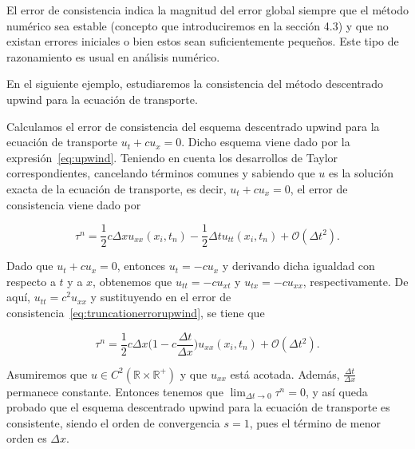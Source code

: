\begin{remark}
  El error de consistencia indica la magnitud del error global
  siempre que el método numérico sea estable
  (concepto que introduciremos en la sección 4.3) y que no existan
  errores iniciales o bien estos sean suficientemente pequeños.
  Este tipo de razonamiento es usual en análisis numérico.
\end{remark}

En el siguiente ejemplo, estudiaremos la consistencia del método
descentrado upwind para la ecuación de transporte.

\begin{example}
  Calculamos el error de consistencia del esquema descentrado upwind
  para la ecuación de transporte
  \begin{math}
    u_{t}+
    cu_{x}=
    0.
  \end{math}
  Dicho esquema viene dado por la expresión~\eqref{eq:upwind}.
  Teniendo en cuenta los desarrollos de Taylor correspondientes,
  cancelando términos comunes y sabiendo que $u$ es la solución
  exacta de la ecuación de transporte, es decir,
  $u_{t}+cu_{x}=0$, el error de consistencia viene dado por

  \begin{equation}\label{eq:truncationerrorupwind}
    \tau^{n}=
    \frac{1}{2}
    c\Delta x
    u_{xx}
    \left(x_{i},t_{n}\right)-
    \frac{1}{2}\Delta t
    u_{tt}
    \left(x_{i},t_{n}\right)+
    \mathcal{O}
    \left(\Delta t^{2}\right).
  \end{equation}

  Dado que $u_{t}+cu_{x}=0$, entonces $u_{t}=-cu_{x}$ y derivando
  dicha igualdad con respecto a $t$ y a $x$, obtenemos que
  $u_{tt}=-cu_{xt}$ y $u_{tx}=-cu_{xx}$, respectivamente.
  De aquí, $u_{tt}=c^{2}u_{xx}$ y sustituyendo en el error de
  consistencia~\eqref{eq:truncationerrorupwind}, se tiene que

  \begin{equation*}
    \tau^{n}=
    \frac{1}{2}
    c\Delta x
    \big(
    1-c\frac{\Delta t}{\Delta x}
    \big)
    u_{xx}
    \left(x_{i},t_{n}\right)+
    \mathcal{O}
    \left(\Delta t^{2}\right).
  \end{equation*}

  Asumiremos que
  \begin{math}
    u\in
    C^{2}
    \left(
    \mathbb{R}\times
    \mathbb{R}^{+}
    \right)
  \end{math}
  y que $u_{xx}$ está acotada.
  Además, $\frac{\Delta t}{\Delta x}$ permanece constante.
  Entonces tenemos que $\lim_{\Delta t\to0}\tau^{n}=0$, y así queda
  probado que el esquema descentrado upwind para la
  ecuación de transporte es consistente, siendo el orden de
  convergencia $s=1$, pues el término de menor orden es $\Delta x$.
\end{example}

